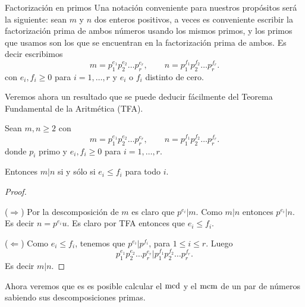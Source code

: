 \begin{section}{Factorización en primos}
Una notación conveniente para nuestros propósitos será la siguiente: sean $m$ y $n$ dos enteros positivos, a veces es conveniente escribir la factorización prima de ambos números usando los mismos primos, y los primos que usamos son los que se encuentran en la factorización prima de ambos. Es decir  escribimos
$$
m=p_1^{e_1}p_2^{e_2}\ldots p_r^{e_r},\qquad
n=p_1^{f_1}p_2^{f_2}\ldots p_r^{f_r}.
$$
con $e_i,f_i \ge 0$ para $i=1,\ldots,r$ y $e_i$ o $f_i$ distinto de cero. 
 
Veremos ahora un resultado que se puede deducir fácilmente del Teorema Fundamental de la Aritmética (TFA).

\begin{proposicion} Sean $m,n \ge2$ con
$$
m=p_1^{e_1}p_2^{e_2}\ldots p_r^{e_r},\qquad
n=p_1^{f_1}p_2^{f_2}\ldots p_r^{f_r}.
$$
donde $p_i$ primo y $e_i,f_i \ge 0$ para $i=1,\ldots,r$. 

Entonces $m|n$ si y sólo si $e_i \le f_i$ para todo $i$.
\end{proposicion}
\begin{proof}
\
    
\noindent($\Rightarrow$) Por la descomposición de $m$ es claro que $p^{e_i}|m$. Como $m|n$ entonces   $p^{e_i}|n$. Es decir $n =  p^{e_i}u$. Es claro por TFA entonces que $e_i \le f_i$.

\noindent($\Leftarrow$) Como $e_i \le f_i$, tenemos que $p^{e_i}|p^{f_i}$, para $1 \le i \le r$.  Luego  $$p_1^{e_1}p_2^{e_2}\ldots p_r^{e_r}| p_1^{f_1}p_2^{f_2}\ldots p_r^{f_r}.$$ Es decir $m|n$.
\end{proof}


%


Ahora veremos que es es posible calcular el $\operatorname{mcd}$ y el $\operatorname{mcm}$ de un par de números sabiendo sus descomposiciones primas.


\end{section}
